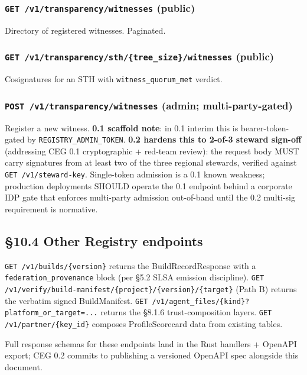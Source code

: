 \documentclass[10pt]{article}
\begin{document}
\subsubsection*{\texttt{GET /v1/transparency/witnesses} (public)}


Directory of registered witnesses. Paginated.


\subsubsection*{\texttt{GET /v1/transparency/sth/\{tree\_size\}/witnesses} (public)}


Cosignatures for an STH with \texttt{witness\_quorum\_met} verdict.


\subsubsection*{\texttt{POST /v1/transparency/witnesses} (admin; multi-party-gated)}


Register a new witness. \textbf{0.1 scaffold note}: in 0.1 interim this is bearer-token-gated by \texttt{REGISTRY\_ADMIN\_TOKEN}. \textbf{0.2 hardens this to 2-of-3 steward sign-off} (addressing CEG 0.1 cryptographic + red-team review): the request body MUST carry signatures from at least two of the three regional stewards, verified against \texttt{GET /v1/steward-key}. Single-token admission is a 0.1 known weakness; production deployments SHOULD operate the 0.1 endpoint behind a corporate IDP gate that enforces multi-party admission out-of-band until the 0.2 multi-sig requirement is normative.


\subsection*{§10.4 Other Registry endpoints}


\texttt{GET /v1/builds/\{version\}} returns the BuildRecordResponse with a \texttt{federation\_provenance} block (per §5.2 SLSA emission discipline). \texttt{GET /v1/verify/build-manifest/\{project\}/\{version\}/\{target\}} (Path B) returns the verbatim signed BuildManifest. \texttt{GET /v1/agent\_files/\{kind\}?platform\_or\_target=...} returns the §8.1.6 trust-composition layers. \texttt{GET /v1/partner/\{key\_id\}} composes ProfileScorecard data from existing tables.


Full response schemas for these endpoints land in the Rust handlers + OpenAPI export; CEG 0.2 commits to publishing a versioned OpenAPI spec alongside this document.
\end{document}
